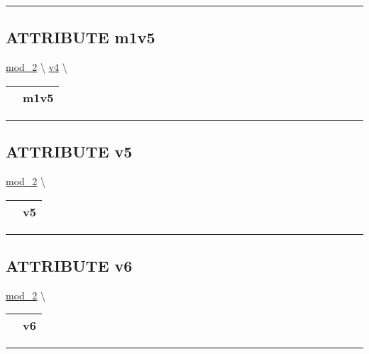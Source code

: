 \rule{\linewidth}{0.5pt}

\subsection*{\textsf{\colorbox{headtoc}{\color{white} ATTRIBUTE}
m1v5}}

\hypertarget{ecldoc:mod_1.m1v4.m1v5}{}
\hspace{0pt} \hyperlink{ecldoc:mod_2}{mod_2} \textbackslash 
\hspace{0pt} \hyperlink{ecldoc:mod_2.v4}{v4} \textbackslash 

{\renewcommand{\arraystretch}{1.5}
\begin{tabularx}{\textwidth}{|>{\raggedright\arraybackslash}l|X|}
\hline
\hspace{0pt}\mytexttt{\color{red} } & \textbf{m1v5} \\
\hline
\end{tabularx}
}

\par


\rule{\linewidth}{0.5pt}


\subsection*{\textsf{\colorbox{headtoc}{\color{white} ATTRIBUTE}
v5}}

\hypertarget{ecldoc:mod_2.v5}{}
\hspace{0pt} \hyperlink{ecldoc:mod_2}{mod_2} \textbackslash 

{\renewcommand{\arraystretch}{1.5}
\begin{tabularx}{\textwidth}{|>{\raggedright\arraybackslash}l|X|}
\hline
\hspace{0pt}\mytexttt{\color{red} } & \textbf{v5} \\
\hline
\end{tabularx}
}

\par


\rule{\linewidth}{0.5pt}
\subsection*{\textsf{\colorbox{headtoc}{\color{white} ATTRIBUTE}
v6}}

\hypertarget{ecldoc:mod_2.v6}{}
\hspace{0pt} \hyperlink{ecldoc:mod_2}{mod_2} \textbackslash 

{\renewcommand{\arraystretch}{1.5}
\begin{tabularx}{\textwidth}{|>{\raggedright\arraybackslash}l|X|}
\hline
\hspace{0pt}\mytexttt{\color{red} } & \textbf{v6} \\
\hline
\end{tabularx}
}

\par


\rule{\linewidth}{0.5pt}


